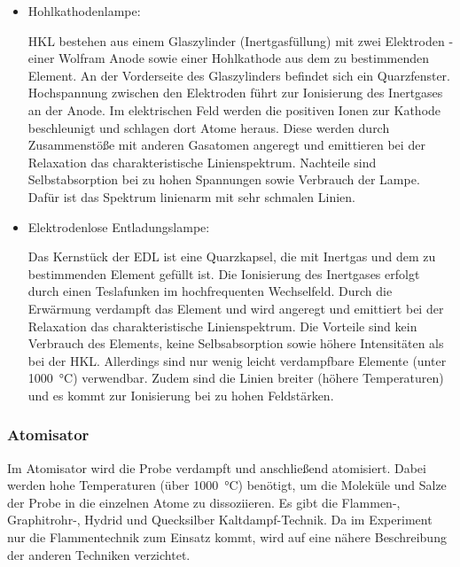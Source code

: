       \begin{itemize}
        \item Hohlkathodenlampe: 
        
          HKL bestehen aus einem Glaszylinder (Inertgasfüllung) mit zwei Elektroden - einer Wolfram Anode sowie einer Hohlkathode aus dem zu bestimmenden Element. An der Vorderseite des Glaszylinders befindet sich ein Quarzfenster. Hochspannung zwischen den Elektroden führt zur Ionisierung des Inertgases an der Anode. Im elektrischen Feld werden die positiven Ionen zur Kathode beschleunigt und schlagen dort Atome heraus. Diese werden durch Zusammenstöße mit anderen Gasatomen angeregt und emittieren bei der Relaxation das charakteristische Linienspektrum. Nachteile sind Selbstabsorption bei zu hohen Spannungen sowie Verbrauch der Lampe. Dafür ist das Spektrum linienarm mit sehr schmalen Linien. \citep[S. 84]{AnalytikIII} 
          
                 
        \item Elektrodenlose Entladungslampe:
        
          Das Kernstück der EDL ist eine Quarzkapsel, die mit Inertgas und dem zu bestimmenden Element gefüllt ist. Die Ionisierung des Inertgases erfolgt durch einen Teslafunken im hochfrequenten Wechselfeld. Durch die Erwärmung verdampft das Element und wird angeregt und emittiert bei der Relaxation das charakteristische Linienspektrum. Die Vorteile sind kein Verbrauch des Elements, keine Selbsabsorption sowie höhere Intensitäten als bei der HKL. Allerdings sind nur wenig leicht verdampfbare Elemente (unter \SI[mode=text]{1000}{\degreeCelsius}) verwendbar. Zudem sind die Linien breiter (höhere Temperaturen) und es kommt zur Ionisierung bei zu hohen Feldstärken. \citep{AnalytikIII} 
          
      \end{itemize}
      
    \subsubsection{Atomisator}
    
      Im Atomisator wird die Probe verdampft und anschließend atomisiert. Dabei werden hohe Temperaturen (über \SI[mode=text]{1000}{\degreeCelsius}) benötigt, um die Moleküle und Salze der Probe in die einzelnen Atome zu dissoziieren. Es gibt die Flammen-, Graphitrohr-, Hydrid und Quecksilber Kaltdampf-Technik. Da im Experiment nur die Flammentechnik zum Einsatz kommt, wird auf eine nähere Beschreibung der anderen Techniken verzichtet. \\
      
